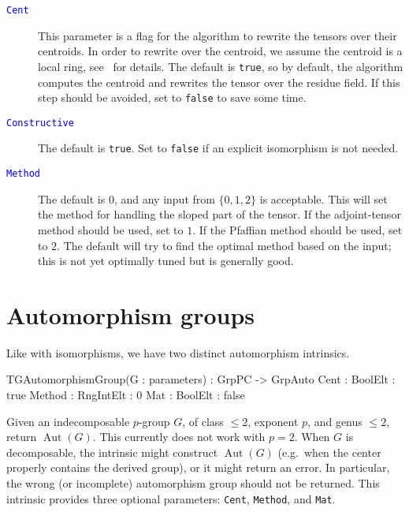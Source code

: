\documentclass{documentation}
\DeclareMathOperator{\Aut}{Aut}
\begin{document}
\begin{description}
\item[\textcolor{blue}{\tt Cent}]
This parameter is a flag for the algorithm to rewrite the tensors over their centroids. In order to rewrite over the centroid, we assume the centroid is a local ring, see~\cite{TensorSpacePackage} for details. The default is \texttt{true}, so by default, the algorithm computes the centroid and rewrites the tensor over the residue field.
If this step should be avoided, set to \texttt{false} to save some time.
\item[\textcolor{blue}{\tt Constructive}]
The default is \texttt{true}. 
Set to \texttt{false} if an explicit isomorphism is not needed.
\item[\textcolor{blue}{\tt Method}]
The default is $0$, and any input from $\{ 0,1,2\}$ is acceptable. 
This will set the method for handling the sloped part of the tensor.
If the adjoint-tensor method should be used, set to $1$. If the Pfaffian method should be used, set to $2$. The default will try to find the optimal method based on the input; this is not yet optimally tuned but is generally good.
\end{description}



\chapter{Automorphism groups}

Like with isomorphisms, we have two distinct automorphism intrinsics. 

\begin{intrinsics}
TGAutomorphismGroup(G : parameters) : GrpPC -> GrpAuto
    Cent : BoolElt : true
    Method : RngIntElt : 0 
    Mat : BoolElt : false
\end{intrinsics}

Given an indecomposable $p$-group $G$, of class $\leq 2$, exponent $p$, and genus $\leq 2$, return $\Aut(G)$.
This currently does not work with $p=2$. When $G$ is decomposable, the intrinsic might construct $\Aut(G)$ (e.g.\ when the center properly contains the derived group), or it might return an error. In particular, the wrong (or incomplete) automorphism group should not be returned. 
This intrinsic provides three optional parameters: \texttt{Cent}, \texttt{Method}, and \texttt{Mat}.
\end{document}
